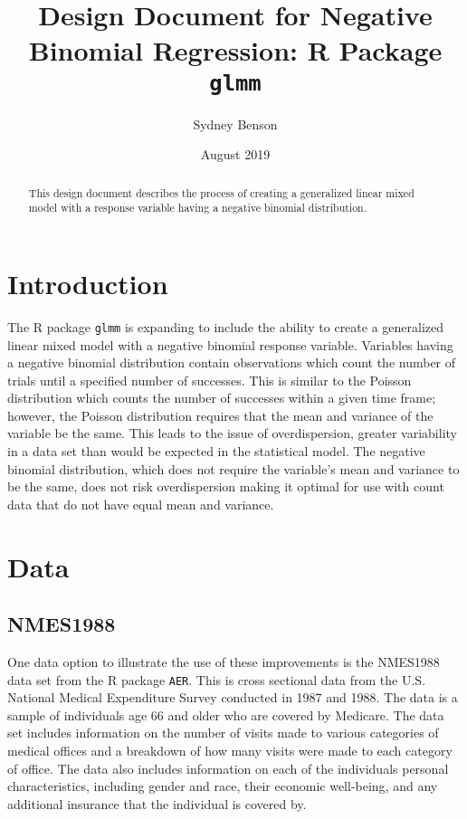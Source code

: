 \documentclass{article}
\title{Design Document for Negative Binomial Regression: R Package \texttt{glmm}}
\author{Sydney Benson}
\date{August 2019}
\begin{document}
\maketitle{}

\begin{abstract}
    This design document describes the process of creating a generalized linear mixed model with a response variable having a negative binomial distribution. 
\end{abstract}

\section{Introduction}
    The R package \texttt{glmm} is expanding to include the ability to create a generalized linear mixed model with a negative binomial response variable. Variables having a negative binomial distribution contain observations which count the number of trials until a specified number of successes. This is similar to the Poisson distribution which counts the number of successes within a given time frame; however, the Poisson distribution requires that the mean and variance of the variable be the same. This leads to the issue of overdispersion, greater variability in a data set than would be expected in the statistical model. The negative binomial distribution, which does not require the variable's mean and variance to be the same, does not risk overdispersion making it optimal for use with count data that do not have equal mean and variance. 
    \section{Data}
        \subsection{NMES1988}
            One data option to illustrate the use of these improvements is the NMES1988 data set from the R package \texttt{AER}. This is cross sectional data from the U.S. National Medical Expenditure Survey conducted in 1987 and 1988. The data is a sample of individuals age 66 and older who are covered by Medicare. The data set includes information on the number of visits made to various categories of medical offices and a breakdown of how many visits were made to each category of office. The data also includes information on each of the individuals personal characteristics, including gender and race, their economic well-being, and any additional insurance that the individual is covered by. 
            
\end{document}
